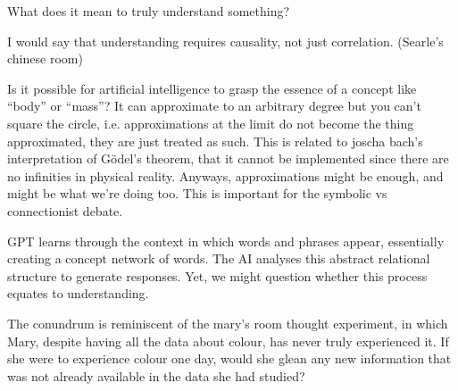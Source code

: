 What does it mean to truly understand something? 

I would say that understanding requires causality, not just correlation. (Searle's chinese room)


Is it possible for artificial intelligence to grasp the essence of a concept like “body” or “mass”? It can approximate to an arbitrary degree but you can't square the circle, i.e. approximations at the limit do not become the thing approximated, they are just treated as such. This is related to joscha bach's interpretation of Gödel's theorem, that it cannot be implemented since there are no infinities in physical reality. Anyways, approximations might be enough, and might be what we're doing too. This is important for the symbolic vs connectionist debate.

GPT learns through the context in which words and phrases appear, essentially creating a concept network of words. The AI analyses this abstract relational structure to generate responses. Yet, we might question whether this process equates to understanding.

The conundrum is reminiscent of the mary's room thought experiment, in which Mary, despite having all the data about colour, has never truly experienced it. If she were to experience colour one day, would she glean any new information that was not already available in the data she had studied?

